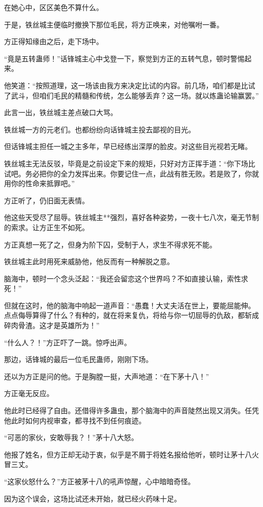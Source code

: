 \begin{this_body}
在她心中，区区美色不算什么。

于是，铁丝城主便临时撤换下那位毛民，将方正唤来，对他嘱咐一番。

方正得知缘由之后，走下场中。

“竟是五转蛊师！”话锋城主心中戈登一下，察觉到方正的五转气息，顿时警惕起来。

他笑道：“按照道理，这一场该由我方来决定比试的内容。前几场，咱们都是比试了武斗，但咱们毛民的精髓和传统，怎么能够丢弃？这一场。就以炼蛊论输赢罢。”

此言一出，铁丝城主差点破口大骂。

铁丝城一方的元老们。也都纷纷向话锋城主投去鄙视的目光。

但话锋城主担任一城之主多年，早已经练出深厚的脸皮。对这些目光视若无睹。

铁丝城主无法反驳，毕竟是之前设定下来的规矩，只好对方正挥手道：“你下场比试吧。务必把你的全力发挥出来。你要记住一点，此战有胜无败。若是败了，你就用你的性命来抵罪吧。”

方正听了，仍旧面无表情。

他这些天受尽了屈辱。铁丝城主**强烈，喜好各种姿势，一夜十七八次，毫无节制的索求。让方正生不如死。

方正真想一死了之，但身为阶下囚，受制于人，求生不得求死不能。

铁丝城主此时用死来威胁他，他反而有一种解脱之意。

脑海中，顿时一个念头泛起：“我还会留恋这个世界吗？不如直接认输，索性求死！”

但就在这时，他的脑海中响起一道声音：“愚蠢！大丈夫活在世上，要能屈能伸。点点侮辱算得了什么？有种的，就在将来复仇，将给与你一切屈辱的仇敌，都斩成碎肉骨渣。这才是英雄所为！”

“什么人？！”方正吓了一跳。惊呼出声。

那边，话锋城的最后一位毛民蛊师，刚刚下场。

还以为方正是问的他。于是胸膛一挺，大声地道：“在下茅十八！”

方正毫无反应。

他此时已经得了自由。还借得许多蛊虫，那个脑海中的声音陡然出现又消失。任凭他此时如何内视审查，都寻找不到任何痕迹。

“可恶的家伙，安敢辱我？！”茅十八大怒。

他报了姓名，但方正却无动于衷，似乎是不屑于将姓名报给他听，顿时让茅十八火冒三丈。

“这家伙怒什么？”方正被茅十八的吼声惊醒，心中暗暗奇怪。

因为这个误会，这场比试还未开始，就已经火药味十足。


\end{this_body}
